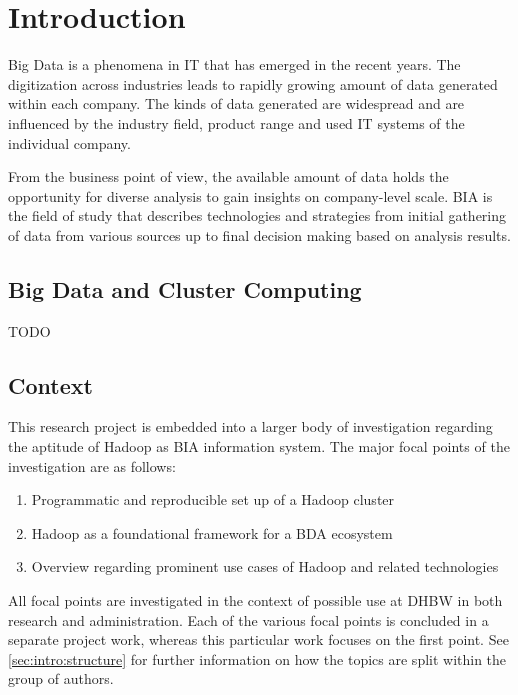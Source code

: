 \chapter{Introduction}
\label{chap:intro}

Big Data is a phenomena in \ac{IT} that has emerged in the recent years.
The digitization across industries leads to rapidly growing amount of data generated
within each company.
The kinds of data generated are widespread 
and are influenced by the industry field, product range and used \ac{IT} systems 
of the individual company.

From the business point of view, the available amount of data 
holds the opportunity for diverse analysis to gain insights on company-level scale.
\ac{BIA} is the field of study that describes technologies and strategies 
from initial gathering of data from various sources 
up to final decision making based on analysis results.    

\section{Big Data and Cluster Computing}
\label{sec:intro:cluster}

TODO

\section{Context}
\label{sec:intro:context}

This research project is embedded into a larger body of investigation regarding the aptitude of Hadoop as \acs{BIA} information system. The major focal points of the investigation are as follows:

\begin{enumerate}
	\item Programmatic and reproducible set up of a Hadoop cluster
	\item Hadoop as a foundational framework for a \acl{BDA} ecosystem
	\item Overview regarding prominent use cases of Hadoop and related technologies
\end{enumerate}

All focal points are investigated in the context of possible use at \acf{DHBW} in both research and administration. Each of the various focal points is concluded in a separate project work, whereas this particular work focuses on the first point.
See \ref{sec:intro:structure} for further information on how the topics are split within the group of authors.

